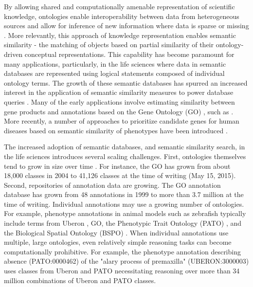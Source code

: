 \documentclass{article}
\begin{document}
By allowing shared and computationally amenable representation of scientific knowledge, ontologies enable interoperability between data from heterogeneous sources \cite{uschold1996ontologies, blake2004bio} and allow for inference of new information where data is sparse or missing \cite{dececchi2015toward,maetschke2012gene}. More relevantly, this approach of knowledge representation enables semantic similarity - the matching of objects based on partial similarity of their ontology-driven conceptual representations. This capability has become paramount for many applications, particularly, in the life sciences where data in semantic databases are represented using logical statements composed of individual ontology terms. The growth of these semantic databases has spurred an increased interest in the application of semantic similarity measures to power database queries \cite{pesquita2009semantic, harispe2014semantic}. Many of the early applications involve estimating similarity between gene products and annotations based on the Gene Ontology (GO) \cite{gene2015gene}, such as \cite{mistry2008gene, couto2007measuring, couto2003implementation,yu2010gosemsim, du2009g, wu2013improving}.  More recently, a number of approaches to prioritize candidate genes for human diseases based on semantic similarity of phenotypes have been introduced \cite{oellrich2012improving, washington2009linking, chen2007improved}. 

The increased adoption of semantic databases, and semantic similarity search, in the life sciences introduces several scaling challenges. First, ontologies themselves tend to grow in size over time \cite{yang2006evaluation}. For instance, the GO has grown from about 18,000 classes in 2004 to 41,126 classes at the time of writing (May 15, 2015). Second, repositories of annotation data are growing. The GO annotation database \cite{?} has grown from 48 annotations in 1999 to more than 3.7 million at the time of writing. Individual annotations may use a growing number of ontologies. For example, phenotype annotations in animal models such as zebrafish typically include terms from Uberon \cite{haendel2014unification}, GO, the Phenotypic Trait Ontology (PATO) \cite{gkoutos2004using}, and the Biological Spatial Ontology (BSPO) \cite{dahdul2014nose}. When individual annotations use multiple, large ontologies, even relatively simple reasoning tasks can become computationally prohibitive. For example, the phenotype annotation describing absence (PATO:0000462) of the "alary process of premaxilla" (UBERON:3000003) uses classes from Uberon and PATO necessitating reasoning over more than 34 million combinations of Uberon and PATO classes. 
\end{document}
